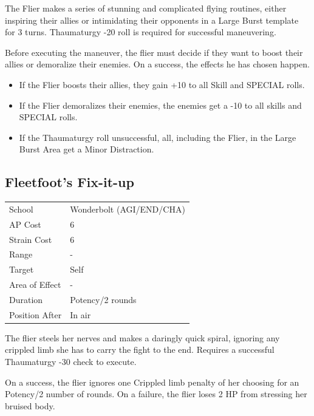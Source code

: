 \documentclass[11pt,a4paper,twocolumn]{book}
\begin{document}
\medskip

The Flier makes a series of stunning and complicated flying routines, either inspiring their allies or intimidating their opponents in a Large Burst template for 3 turns. Thaumaturgy -20 roll is required for successful maneuvering.

Before executing the maneuver, the flier must decide if they want to boost their allies or demoralize their enemies. On a success, the effects he has chosen happen.

\begin{itemize}
  \item	If the Flier boosts their allies, they gain +10 to all Skill and SPECIAL rolls.
  \item If the Flier demoralizes their enemies, the enemies get a -10 to all skills and SPECIAL rolls.
  \item If the Thaumaturgy roll unsuccessful, all, including the Flier, in the Large Burst Area get a Minor Distraction.
\end{itemize}

\vfill


\subsection*{Fleetfoot's Fix-it-up}
{
	\begin{tabu} to 75mm{| X[l,4] | X[l,7] |}
		\hline
		School 			& Wonderbolt (AGI/END/CHA)		\\
        AP Cost	      	& 6 				\\
        Strain Cost     & 6 				\\
        Range     		& - 				\\
        Target      	& Self 				\\
        Area of Effect  & -	 				\\
        Duration     	& Potency/2 rounds	 	\\
		Position After  & In air 			\\ \hline
	\end{tabu}
		
}

\medskip

The flier steels her nerves and makes a daringly quick spiral, ignoring any crippled limb she has to carry the fight to the end. Requires a successful Thaumaturgy -30 check to execute.

On a success, the flier ignores one Crippled limb penalty of her choosing for an Potency/2 number of rounds. On a failure, the flier loses 2 HP from stressing her bruised body.
\end{document}
